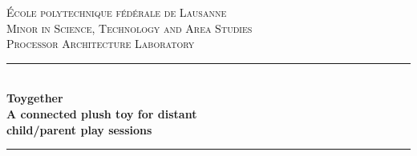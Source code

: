 \begin{titlepage}

\newcommand{\HRule}{\rule{\linewidth}{0.5mm}} %

\renewcommand\labelitemi{{\boldmath$\cdot$}}

\makeatletter
\renewcommand\p@subfigure{\thefigure}
\makeatother


\center %
 

\textsc{\LARGE École polytechnique fédérale de Lausanne}\\[1.5cm] %
\textsc{\Large Minor in Science, Technology and Area Studies}\\[0.5cm] %
\textsc{\large  Processor Architecture Laboratory}\\[0.5cm] %


\HRule \\[0.4cm] 
{ \huge \bfseries Toygether\\\vspace{3mm} 
    \LARGE \bfseries A connected plush toy for distant\\child/parent play sessions }\\[0.2cm] %
\HRule \\[1.5cm]
 

\begin{minipage}{0.4\textwidth}
\begin{flushleft} \large


\end{flushleft}
\end{minipage}
\end{titlepage}
